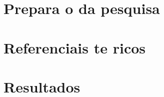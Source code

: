 \documentclass{article}
\begin{document}








    \textual
    

    


    \part{Prepara o da pesquisa}
    


    \part{Referenciais te ricos}



    \part{Resultados}





\end{document}
